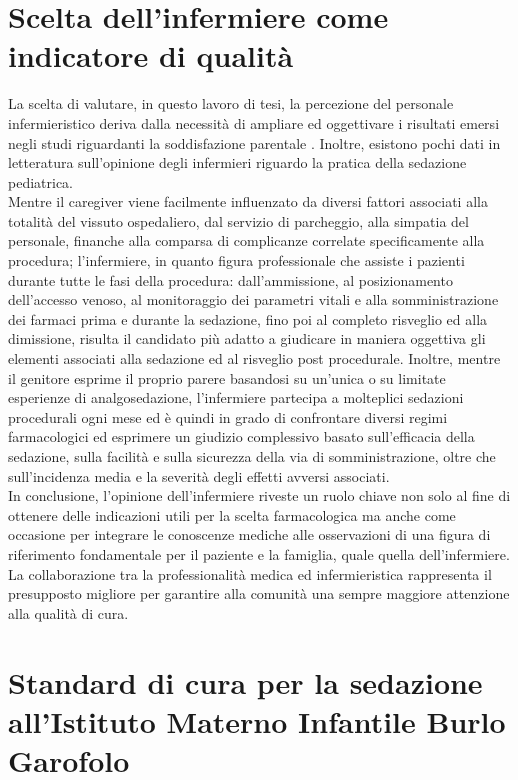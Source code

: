 \section{Scelta dell'infermiere come indicatore di qualità}

La scelta di valutare, in questo lavoro di tesi, la percezione del personale infermieristico deriva dalla necessità di ampliare ed oggettivare i risultati emersi negli studi riguardanti la soddisfazione parentale \cite{Cortellazzo2022, Lew2010, Connor2014}. Inoltre, esistono pochi dati in letteratura sull'opinione degli infermieri riguardo la pratica della sedazione pediatrica.\\
Mentre il caregiver viene facilmente influenzato da diversi fattori associati alla totalità del vissuto ospedaliero, dal servizio di parcheggio, alla simpatia del personale, finanche alla comparsa di complicanze correlate specificamente alla procedura; l'infermiere, in quanto figura professionale che assiste i pazienti durante tutte le fasi della procedura: dall'ammissione, al posizionamento dell'accesso venoso, al monitoraggio dei parametri vitali e alla somministrazione dei farmaci prima e durante la sedazione, fino poi al completo risveglio ed alla dimissione, risulta il candidato più adatto a giudicare in maniera oggettiva gli elementi associati alla sedazione ed al risveglio post procedurale. Inoltre, mentre il genitore esprime il proprio parere basandosi su un'unica o su limitate esperienze di analgosedazione, l'infermiere partecipa a molteplici sedazioni procedurali ogni mese ed è quindi in grado di confrontare diversi regimi farmacologici ed esprimere un giudizio complessivo basato sull'efficacia della sedazione, sulla facilità e sulla sicurezza della via di somministrazione, oltre che sull'incidenza media e la severità degli effetti avversi associati.
\\In conclusione, l'opinione dell'infermiere riveste un ruolo chiave non solo al fine di ottenere delle indicazioni utili per la scelta farmacologica ma anche come occasione per integrare le conoscenze mediche alle osservazioni di una figura di riferimento fondamentale per il paziente e la famiglia, quale quella dell'infermiere. La collaborazione tra la professionalità medica ed infermieristica rappresenta il presupposto migliore per garantire alla comunità una sempre maggiore attenzione alla qualità di cura. 

\section{Standard di cura per la sedazione all'Istituto Materno Infantile Burlo Garofolo}

